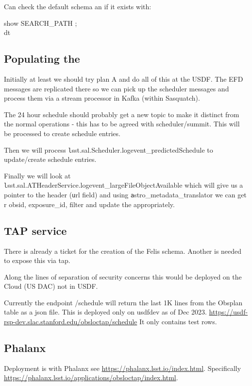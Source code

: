 Can check the default schema an if  it exists with:
\begin{code}
show SEARCH\_PATH ;
\\dt
\end{code}


\subsection{Populating the \DB}

Initially at least we should try plan A and do all of this at the USDF.
The EFD messages are replicated there so we can pick up the scheduler messages and process them via a stream processor in Kafka (within Sasquatch).

The 24 hour schedule should probably get a new topic to make it distinct from the normal operations - this has to be agreed with scheduler/summit. This will be processed to create schedule entries.

Then we will process {\texttt lsst.sal.Scheduler.logevent\_predictedSchedule } to update/create schedule entries.

Finally we will look at {\texttt lsst.sal.ATHeaderService.logevent\_largeFileObjectAvailable} which will give us a pointer to the header ({\texttt url} field) and using {\texttt astro\_metadata\_translator}  we can get r obsid, exposure\_id, filter and update the \DB appropriately.

\subsection{TAP service}

There is already a ticket  for the creation of the Felis schema.
Another is needed to expose this via tap.

Along the lines of separation of security concerns this would be deployed on the Cloud (US DAC) not in USDF.

Currently the endpoint /schedule will return the last 1K lines from the Obsplan table as a json file.
This is deployed only on usdfdev as of Dec 2023.
\url{https://usdf-rsp-dev.slac.stanford.edu/obsloctap/schedule}
It only contains test rows.


\subsection{Phalanx}
Deployment is with Phalanx  see \url{https://phalanx.lsst.io/index.html}.
Specifically \url{https://phalanx.lsst.io/applications/obsloctap/index.html}.


